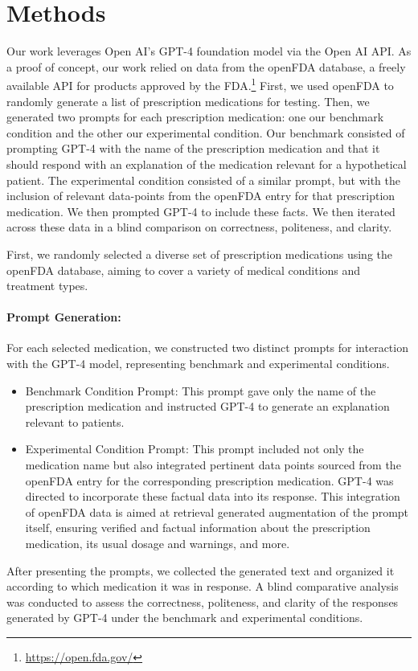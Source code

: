 \documentclass{article}
\begin{document}
\section{Methods}
Our work leverages Open AI's GPT-4 foundation model via the Open AI API. As a proof of concept, our work relied on data from the openFDA database, a freely available API for products approved by the FDA.\footnote[1]{\url{https://open.fda.gov/}} First, we used openFDA to randomly generate a list of prescription medications for testing. Then, we generated two prompts for each prescription medication: one our benchmark condition and the other our experimental condition. Our benchmark consisted of prompting GPT-4 with the name of the prescription medication and that it should respond with an explanation of the medication relevant for a hypothetical patient. The experimental condition consisted of a similar prompt, but with the inclusion of relevant data-points from the openFDA entry for that prescription medication. We then prompted GPT-4 to include these facts. We then iterated across these data in a blind comparison on correctness, politeness, and clarity. 

First, we randomly selected a diverse set of prescription medications using the openFDA database, aiming to cover a variety of medical conditions and treatment types.
\paragraph{Prompt Generation:}For each selected medication, we constructed two distinct prompts for interaction with the GPT-4 model, representing benchmark and experimental conditions. \begin{itemize}
    \item Benchmark Condition Prompt: This prompt gave only the name of the prescription medication and instructed GPT-4 to generate an explanation relevant to patients.
    \item Experimental Condition Prompt: This prompt included not only the medication name but also integrated pertinent data points sourced from the openFDA entry for the corresponding prescription medication. GPT-4 was directed to incorporate these factual data into its response. This integration of openFDA data is aimed at retrieval generated augmentation of the prompt itself, ensuring verified and factual information about the prescription medication, its usual dosage and warnings, and more.
\end{itemize}
After presenting the prompts, we collected the generated text and organized it according to which medication it was in response.
A blind comparative analysis was conducted to assess the correctness, politeness, and clarity of the responses generated by GPT-4 under the benchmark and experimental conditions.
\end{document}

